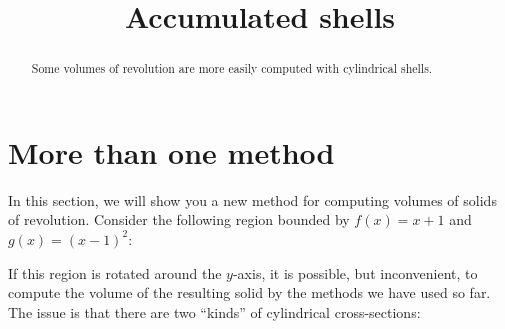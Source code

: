 \documentclass{ximera}
\title[Dig-In:]{Accumulated shells}
\begin{document}
\begin{abstract}
Some volumes of revolution are more easily computed with cylindrical shells.
\end{abstract}
\maketitle


\section{More than one method}

In this section, we will show you a new method for computing volumes
of solids of revolution.  Consider the following region bounded by
$f(x)=x+1$ and $g(x)=(x-1)^2$:
\begin{image}
\end{image}
If this region is rotated around the $y$-axis, it is possible, but
inconvenient, to compute the volume of the resulting solid by the
methods we have used so far. The issue is that there are two
``kinds'' of cylindrical cross-sections: 
\end{document}
